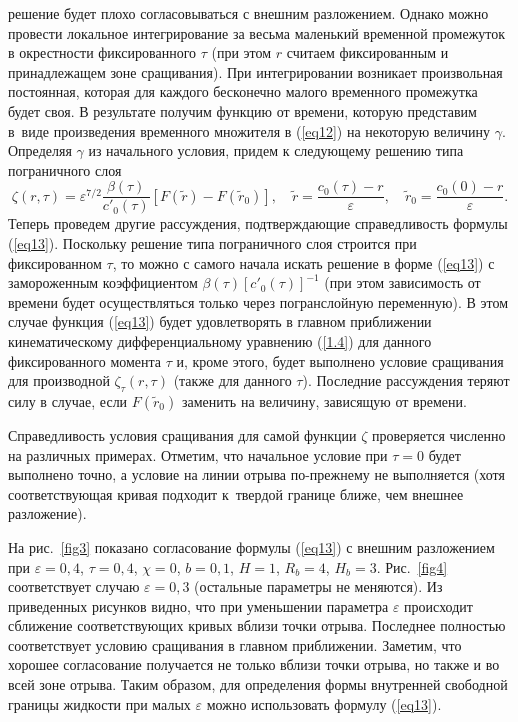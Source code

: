 \documentclass[press]{vestnik}
\begin{document}
решение будет плохо согласовываться с внешним разложением. Однако можно 
провести локальное интегрирование за весьма маленький временной промежуток в 
окрестности фиксированного $\tau $ (при этом $r$ считаем фиксированным и 
принадлежащем зоне сращивания). При интегрировании возникает произвольная 
постоянная, которая для каждого бесконечно малого временного промежутка 
будет своя. В результате получим функцию от времени, которую представим в~виде произведения временного множителя в (\ref{eq12}) на некоторую величину 
$\gamma $. Определяя $\gamma$ из начального условия, придем к 
следующему решению типа пограничного слоя
\begin{equation}
\label{eq13}
\zeta (r,\tau )=\varepsilon^{7/2}\frac{\beta (\tau )}{{c}'_{0} (\tau 
)}\left[ {F(\tilde{{r}})-F(\tilde{{r}}_{0} )} \right] ,
\quad
\tilde{{r}}=\frac{c_{0} (\tau )-r}{\varepsilon } ,
\quad
\tilde{{r}}_{0} =\frac{c_{0} (0)-r}{\varepsilon }.
\end{equation}
Теперь проведем другие рассуждения, подтверждающие справедливость формулы 
(\ref{eq13}). \mbox{Поскольку} решение типа пограничного слоя строится при фиксированном 
$\tau $, то можно с самого начала искать решение в форме (\ref{eq13}) с 
замороженным коэффициентом $\beta (\tau )[{c}'_{0} (\tau )]^{-1}$ (при этом 
зависимость от времени будет осуществляться только через погранслойную 
переменную). В этом случае функция (\ref{eq13}) будет удовлетворять в главном 
приближении кинематическому дифференциальному уравнению (\ref{1.4}) для данного 
фиксированного момента $\tau $ и, кроме этого, будет выполнено условие 
сращивания для производной $\zeta_{\tau } (r,\tau )$ (также для данного 
$\tau$). \mbox{Последние} рассуждения теряют силу в случае, если 
$F(\tilde{{r}}_{0} )$ заменить на величину, зависящую от времени.

Справедливость условия сращивания для самой функции $\zeta $ проверяется 
численно на различных примерах. Отметим, что начальное условие при $\tau =0$ 
будет выполнено точно, а условие на линии отрыва по-прежнему не выполняется 
(хотя соответствующая кривая подходит к~твердой границе ближе, чем внешнее 
разложение).

На рис.~\ref{fig3} показано согласование формулы (\ref{eq13}) с внешним разложением при 
$\varepsilon =0,4$, $\tau =0,4$, $\chi =0$, $b=0,1$, $H=1$, $R_{b} =4$, 
$H_{b} =3$. Рис.~\ref{fig4} соответствует случаю $\varepsilon =0,3$ (остальные 
параметры не меняются). Из приведенных рисунков видно, что при уменьшении 
параметра $\varepsilon $ происходит сближение соответствующих кривых вблизи 
точки отрыва. Последнее полностью соответствует условию сращивания в главном 
приближении. Заметим, что хорошее согласование получается не только вблизи 
точки отрыва, но также и во всей зоне отрыва. Таким образом, для определения 
формы внутренней свободной границы жидкости при малых $\varepsilon $ можно 
использовать формулу (\ref{eq13}). 
\end{document}
